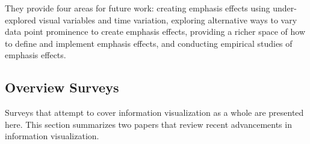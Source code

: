 %

They provide four areas for future work: creating emphasis effects using under-explored visual variables and time variation, exploring alternative ways to vary data point prominence to create emphasis effects, providing a richer space of how to define and implement emphasis effects, and conducting empirical studies of emphasis effects.


\subsection{Overview Surveys}
Surveys that attempt to cover information visualization as a whole are presented here. This section summarizes two papers that review recent advancements in information visualization.

